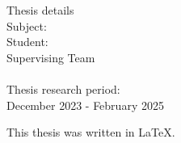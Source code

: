 \pagestyle{empty}
\hspace{10pt}
\begin{center}
\Large{Thesis details}\\[1cm]
{\large Subject:}
\textbf{\large \doctitle}\\[1cm]
\large {Student: \textbf{\nomme}\\[1cm]
\large{Supervising Team}\\
\textbf{\suptitle \, \supname}\\[1cm]
Thesis research period:\\ December 2023 - February 2025\\[1cm]}
\end{center}

\vspace{30em}

\begin{center}
  { \large
    This thesis was written in \LaTeX.\\
  }
\end{center}

